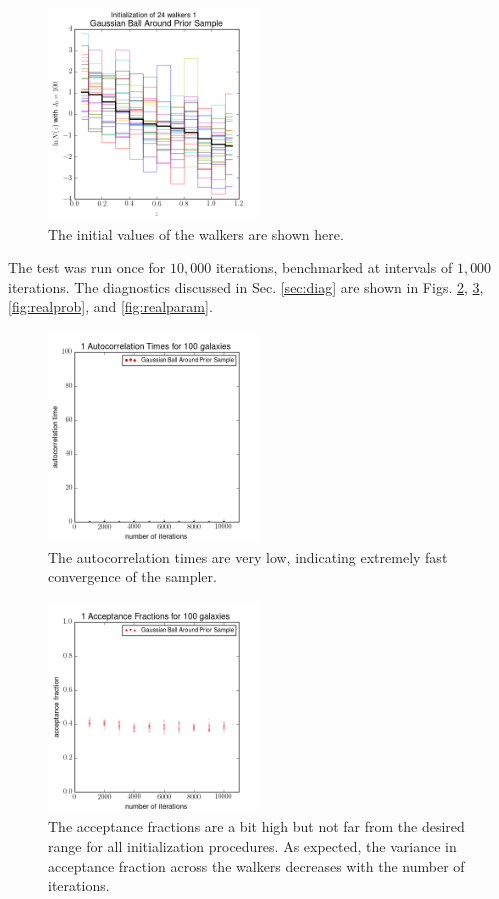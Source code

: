 \documentclass[preprint]{aastex}
\begin{document}
\begin{figure}
\includegraphics[width=0.5\textwidth]{real/initializations.png}
\caption{The initial values of the walkers are shown here.}
\label{fig:realival}
\end{figure}

The test was run once for $10,000$ iterations, benchmarked at intervals of $1,000$ iterations.  The diagnostics discussed in Sec. \ref{sec:diag} are shown in Figs. \ref{fig:realacor}, \ref{fig:realfrac}, \ref{fig:realprob}, and \ref{fig:realparam}.

\begin{figure}
\includegraphics[width=0.5\textwidth]{real/times.png}
\caption{The autocorrelation times are very low, indicating extremely fast convergence of the sampler.}
\label{fig:realacor}
\end{figure}

\begin{figure}
\includegraphics[width=0.5\textwidth]{real/fracs.png}
\caption{The acceptance fractions are a bit high but not far from the desired range for all initialization procedures.  As expected, the variance in acceptance fraction across the walkers decreases with the number of iterations.}
\label{fig:realfrac}
\end{figure}
\end{document}
